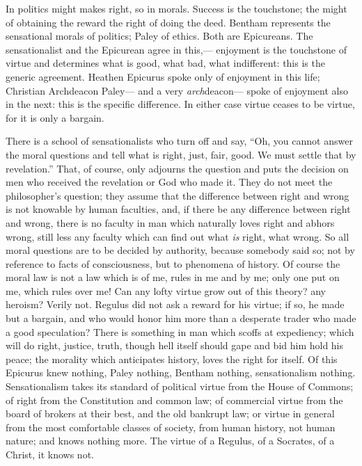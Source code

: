 \documentclass[12pt]{article}
\begin{document}
In politics might makes right, so in morals. Success is the touchstone; the might of obtaining the reward the right of doing the deed. Bentham represents the sensational morals of politics; Paley of ethics. Both are Epicureans. The sensationalist and the Epicurean agree in this,--- enjoyment is the touchstone of virtue and determines what is good, what bad, what indifferent: this is the generic agreement. Heathen Epicurus spoke only of enjoyment in this life; Christian Archdeacon Paley--- and a very \emph{arch}deacon--- spoke of enjoyment also in the next: this is the specific difference. In either case virtue ceases to be virtue, for it is only a bargain. 


There is a school of sensationalists who turn off and say, ``Oh, you cannot answer the moral questions and tell what is right, just, fair, good. We must settle that by revelation.'' That, of course, only adjourns the question and puts the decision on men who received the revelation or God who made it. They do not meet the philosopher's question; they assume that the difference between right and wrong is not knowable by human faculties, and, if there be any difference between right and wrong, there is no faculty in man which naturally loves right and abhors wrong, still less any faculty which can find out what \emph{is} right, what wrong. So all moral questions are to be decided by authority, because somebody said so; not by reference to facts of consciousness, but to phenomena of history. Of course the moral law is not a law which is of me, rules in me and by me; only one put on me, which rules over me! Can any lofty virtue grow out of this theory? any heroism? Verily not. Regulus did not ask a reward for his virtue; if so, he made but a bargain, and who would honor him more than a desperate trader who made a good speculation? There is something in man which scoffs at expediency; which will do right, justice, truth, though hell itself should gape and bid him hold his peace; the morality which anticipates history, loves the right for itself. Of this Epicurus knew nothing, Paley nothing, Bentham nothing, sensationalism nothing. Sensationalism takes its standard of political virtue from the House of Commons; of right from the Constitution and common law; of commercial virtue from the board of brokers at their best, and the old bankrupt law; or virtue in general from the most comfortable classes of society, from human history, not human nature; and knows nothing more. The virtue of a Regulus, of a Socrates, of a Christ, it knows not. 
\end{document}
